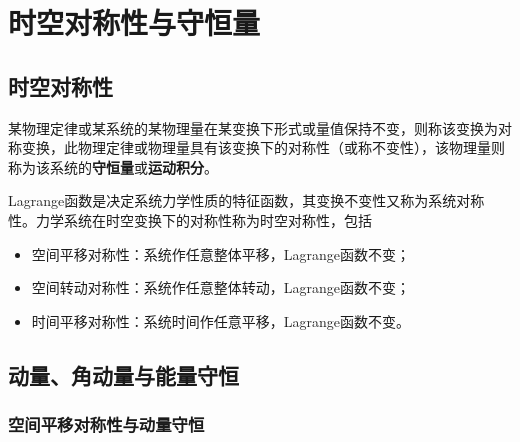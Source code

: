 \section{时空对称性与守恒量}\label{chapter2:section-时空对称性与守恒量}

\subsection{时空对称性}

某物理定律或某系统的某物理量在某变换下形式或量值保持不变，则称该变换为{\heiti 对称变换}，此物理定律或物理量具有该变换下的{\heiti 对称性}（或称{\heiti 不变性}），该物理量则称为该系统的{\bf 守恒量}或{\bf 运动积分}。

Lagrange函数是决定系统力学性质的特征函数，其变换不变性又称为系统对称性。力学系统在时空变换下的对称性称为{\heiti 时空对称性}，包括
\begin{itemize}
	\item {\heiti 空间平移对称性}：系统作任意整体平移，Lagrange函数不变；
	\item {\heiti 空间转动对称性}：系统作任意整体转动，Lagrange函数不变；
	\item {\heiti 时间平移对称性}：系统时间作任意平移，Lagrange函数不变。
\end{itemize}

\subsection{动量、角动量与能量守恒}

\subsubsection{空间平移对称性与动量守恒}

